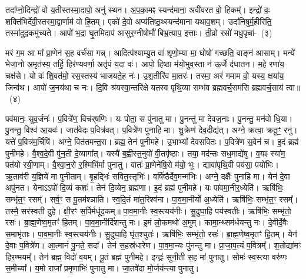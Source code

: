 तदा᳚प्नो॒दिन्द्रो॑ वो य॒तीस्तस्मा॒दापो॒ अनु॑ स्थन। अ॒प॒का॒मꣴ स्यन्द॑माना॒ अवी॑वरत वो॒ हिकम्᳚। इन्द्रो॑ वः॒ शक्ति॑भिर्देवी॒स्तस्मा॒द्वार्णाम॑ वो हि॒तम्। एको॑ दे॒वो अप्य॑तिष्ठ॒थ्स्यन्द॑माना यथाव॒शम्। उदा॑निषुर्म॒हीरिति॒ तस्मा॑दुद॒कमु॑च्यते। आपो॑ भ॒द्रा घृ॒तमिदाप॑ आसुर॒ग्नी\-षोमौ॑ बिभ्र॒त्याप॒ इत्ताः। ती॒व्रो रसो॑ मधु॒पृचा॑-~(३)

मरं ग॒म आ मा᳚ प्रा॒णेन॑ स॒ह वर्च॑सा गन्न्। आदित्प॑श्याम्यु॒त वा॑ शृणो॒म्या मा॒ घोषो॑ गच्छति॒ वाङ्न॑ आसाम्। मन्ये॑ भेजा॒नो अ॒मृत॑स्य॒ तर्\mbox{}हि॒ हिर॑ण्यवर्णा॒ अतृ॑पं य॒दा वः॑। आपो॒ हि\-ष्ठा म॑यो॒भुव॒स्ता न॑ ऊ॒र्जे द॑धातन। म॒हे रणा॑य॒ चक्ष॑से। यो वः॑ शि॒वत॑मो॒ रस॒स्तस्य॑ भाजयते॒ह नः॑। उ॒श॒तीरि॑व मा॒तरः॑। तस्मा॒ अरं॑ गमाम वो॒ यस्य॒ क्षया॑य॒ जिन्व॑थ। आपो॑ ज॒नय॑था च नः। दि॒वि श्र॑यस्वा॒न्तरि॑क्षे यतस्व पृथि॒व्या सम्भ॑व ब्रह्मवर्च॒सम॑सि ब्रह्मवर्च॒साय॑ त्वा॥~(४)



पव॑मानः॒ सुव॒र्जनः॑। प॒वित्रे॑ण॒ विच॑र्‌षणिः। यः पोता॒ स पु॑नातु मा। पु॒नन्तु॑ मा देवज॒नाः।
पु॒नन्तु॒ मन॑वो धि॒या। पु॒नन्तु॒ विश्व॑ आ॒यवः॑। जात॑वेदः प॒वित्र॑वत्। प॒वित्रे॑ण पुनाहि मा।
शु॒क्रेण॑ देव॒दीद्य॑त्। अग्ने॒ क्रत्वा॒ क्रतू॒ꣳ॒ रनु॑। यत्ते॑ प॒वित्र॑म॒र्चिषि॑। अग्ने॒ वित॑तमन्त॒रा।
ब्रह्म॒ तेन॑ पुनीमहे। उ॒भाभ्यां᳚ देवसवितः। प॒वित्रे॑ण स॒वेन॑ च। इ॒दं ब्रह्म॑ पुनीमहे।
वै॒श्व॒दे॒वी पु॑न॒ती दे॒व्यागा᳚त्। यस्यै॑ ब॒ह्वीस्त॒नुवो॑ वी॒तपृ॑ष्ठाः।
तया॒ मद॑न्तः सध॒माद्ये॑षु। व॒यꣴ स्या॑म॒ पत॑यो रयी॒णाम्।
वै॒श्वा॒न॒रो र॒श्मिभि॑र्मा पुनातु। वातः॑ प्रा॒णेने॑षि॒रो म॑यो॒ भूः।
द्यावा॑पृथि॒वी पय॑सा॒ पयो॑भिः। ऋ॒ताव॑री य॒ज्ञिये॑ मा पुनीताम्।
बृ॒हद्भिः॑ सवित॒स्तृभिः॑। वर्{}षि॑ष्ठैर्देव॒मन्म॑भिः।
अग्ने॒ दक्षैः᳚ पुनाहि मा। येन॑ दे॒वा अपु॑नत।
येनाऽऽपो॑ दि॒व्यं कशः॑। तेन॑ दि॒व्येन॒ ब्रह्म॑णा। इ॒दं ब्रह्म॑ पुनीमहे। यः पा॑वमा॒नीर॒ध्येति॑।
ऋषि॑भिः॒ सम्भृ॑त॒ꣳ॒ रसम्᳚। सर्व॒ꣳ॒ स पू॒तम॑श्ञाति।
स्व॒दि॒तं मा॑त॒रिश्व॑ना। पा॒व॒मा॒नीर्यो अ॒ध्येति॑।
ऋषि॑भिः॒ सम्भृ॑त॒ꣳ॒ रसम्᳚। तस्मै॒ सर॑स्वती दुहे। क्षी॒रꣳ स॒र्पिर्मधू॑द॒कम्॥
पा॒व॒मा॒नीः स्व॒स्त्यय॑नीः। सु॒दुघा॒हि पय॑स्वतीः।
ऋषि॑भिः॒ सम्भृ॑तो॒ रसः॑। ब्रा॒ह्म॒णेष्व॒मृतꣳ॑ हि॒तम्।
पा॒व॒मा॒नीर्दि॑शन्तु नः। इ॒मं लो॒कमथो॑ अ॒मुम्।
कामा॒न्थ्सम॑र्धयन्तु नः। दे॒वीर्दे॒वैः स॒माभृ॑ताः।
पा॒व॒मा॒नीः स्व॒स्त्यय॑नीः। सु॒दुघा॒हि घृ॑त॒श्चुतः॑।
ऋषि॑भिः॒ सम्भृ॑तो॒ रसः॑। ब्रा॒ह्म॒णेष्व॒मृतꣳ॑ हि॒तम्।
येन॑ दे॒वाः प॒वित्रे॑ण। आ॒त्मानं॑ पु॒नते॒ सदा᳚।
तेन॑ स॒हस्र॑धारेण। पा॒व॒मा॒न्यः पु॑नन्तु मा।
प्रा॒जा॒प॒त्यं प॒वित्रम्᳚। श॒तोद्या॑मꣳ हिर॒ण्मयम्᳚।
तेन॑ ब्रह्म॒ विदो॑ व॒यम्। पू॒तं ब्रह्म॑ पुनीमहे।
इन्द्रः॑ सुनी॒ती स॒ह मा॑ पुनातु। सोमः॑ स्व॒स्त्या वरु॑णः स॒मीच्या᳚।
य॒मो राजा᳚ प्रमृ॒णाभिः॑ पुनातु मा। जा॒तवे॑दा मो॒र्जय॑न्त्या पुनातु। 

